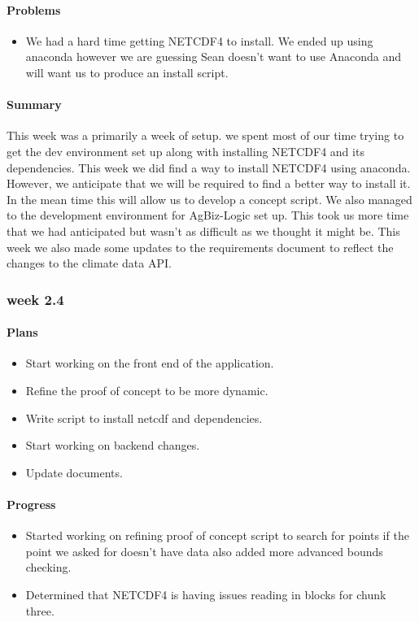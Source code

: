 \documentclass[onecolumn, draftclsnofoot,10pt, compsoc]{article}
\begin{document}
			\paragraph{Problems} \hfill \break
				\begin{itemize}
					\item We had a hard time getting NETCDF4 to install. We ended up using anaconda however we are guessing Sean doesn't want to use Anaconda and will want us to produce an install script.\\
				\end{itemize}
			\paragraph{Summary} \hfill \break
			This week was a primarily a week of setup. we spent most of our time trying to get the dev environment set up along with installing NETCDF4 and its dependencies. This week we did find a way to install NETCDF4 using anaconda. However, we anticipate that we will be required to find a better way to install it. In the mean time this will allow us to develop a concept script. We also managed to the development environment for AgBiz-Logic set up. This took us more time that we had anticipated but wasn't as difficult as we thought it might be. This week we also made some updates to the requirements document to reflect the changes to the climate data API.\\

		\subsubsection{week 2.4}
			\paragraph{Plans} \hfill \break
				\begin{itemize}
					\item Start working on the front end of the application.
					\item Refine the proof of concept to be more dynamic.
					\item Write script to install netcdf and dependencies.
					\item Start working on backend changes.
					\item Update documents.
				\end{itemize}
			\paragraph{Progress} \hfill \break
				\begin{itemize}
					\item Started working on refining proof of concept script to search for points if the point we asked for doesn't have data also added more advanced bounds checking.
					\item Determined that NETCDF4 is having issues reading in blocks for chunk three.
				\end{itemize}
\end{document}
